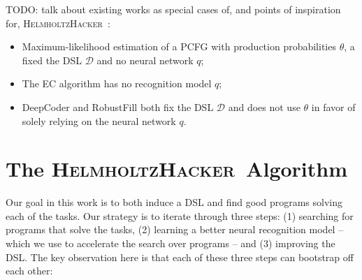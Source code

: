\documentclass{article}
\newcommand{\system}{\textsc{HelmholtzHacker}~}
\newcommand{\probability}{\mathds{P}} %
\begin{document}
TODO: talk about existing works as special cases of, and points of inspiration for, \system:
\begin{itemize}
  \item Maximum-likelihood estimation of a PCFG \citep{DBLP:conf/icml/LiangJK10} with
    production probabilities $\theta$, a fixed the DSL $\mathcal{D}$ and no neural network
    $q$;
  \item The EC algorithm \citep{Dechter:2013:BLV:2540128.2540316} has no recognition model
    $q$;
  \item DeepCoder and RobustFill \citep{balog2016deepcoder,devlin2017robustfill} both fix the
    DSL $\mathcal{D}$ and does not use $\theta$ in favor of solely relying on the neural
    network $q$.
\end{itemize}




\section{The \system Algorithm}

Our goal in this work is to both induce a DSL and find good programs solving each of the tasks.
Our strategy is to iterate through three steps: (1) searching for programs that
solve the tasks, (2) learning a better neural recognition model -- which we use
to accelerate the search over programs -- and (3) improving the DSL.
The key observation here is that each of these three steps can bootstrap off each other:
\end{document}

